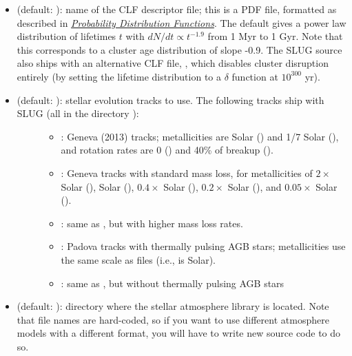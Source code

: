 \documentclass[letterpaper,10pt,english]{sphinxmanual}
\begin{document}
\begin{itemize}
\item {} 
 (default: ): name of the CLF descriptor file; this is a PDF file, formatted as described in {\hyperref[pdfs:sec-pdfs]{\emph{Probability Distribution Functions}}}. The default gives a power law distribution of lifetimes \(t\) with \(dN/dt\propto t^{-1.9}\) from 1 Myr to 1 Gyr. Note that this corresponds to a cluster age distribution of slope -0.9. The SLUG source also ships with an alternative CLF file, , which disables cluster disruption entirely (by setting the lifetime distribution to a \(\delta\) function at \(10^{300}\) yr).

\item {} \begin{description}
\item[{ (default: ): stellar evolution tracks to use. The following tracks ship with SLUG (all in the directory ):}] \leavevmode\begin{itemize}
\item {} 
: Geneva (2013) tracks; metallicities are Solar () and 1/7 Solar (), and rotation rates are 0 () and 40\% of breakup ().

\item {} 
: Geneva tracks with standard mass loss, for metallicities of \(2\times\) Solar (), Solar (), \(0.4\times\) Solar (), \(0.2\times\) Solar (), and \(0.05\times\) Solar ().

\item {} 
: same as , but with higher mass loss rates.

\item {} 
: Padova tracks with thermally pulsing AGB stars; metallicities use the same scale as  files (i.e.,  is Solar).

\item {} 
: same as , but without thermally pulsing AGB stars

\end{itemize}

\end{description}

\item {} 
 (default: ): directory where the stellar atmosphere library is located. Note that file names are hard-coded, so if you want to use different atmosphere models with a different format, you will have to write new source code to do so.


\end{itemize}
\end{document}
